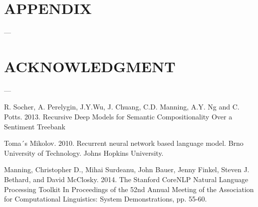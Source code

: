 \documentclass[letterpaper, 10 pt, conference]{ieeeconf}  %
\begin{document}
\addtolength{\textheight}{-12cm}   %







\section*{APPENDIX}
---

\section*{ACKNOWLEDGMENT}
---


\begin{thebibliography}{99}

 R. Socher, A. Perelygin, J.Y.Wu, J. Chuang,
C.D. Manning, A.Y. Ng and C. Potts. 2013. Recursive Deep Models for Semantic Compositionality Over a Sentiment Treebank

 Toma´s Mikolov. 2010. Recurrent neural network based language model. Brno University of Technology. Johns Hopkins University. 

 Manning, Christopher D., Mihai Surdeanu, John Bauer, Jenny Finkel, Steven J. Bethard, and David McClosky. 2014. The Stanford CoreNLP Natural Language Processing Toolkit In Proceedings of the 52nd Annual Meeting of the Association for Computational Linguistics: System Demonstrations, pp. 55-60. 
\end{thebibliography}
\end{document}
